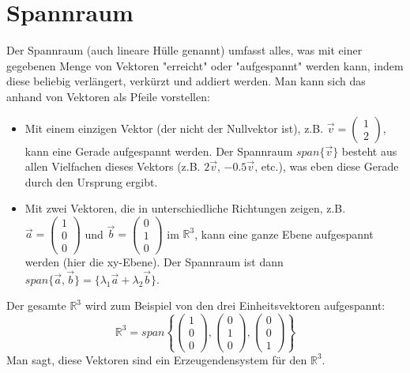 \section{Spannraum}
Der Spannraum (auch lineare Hülle genannt) umfasst alles, was mit einer gegebenen Menge von Vektoren "erreicht" oder "aufgespannt" werden kann, indem diese beliebig verlängert, verkürzt und addiert werden.
Man kann sich das anhand von Vektoren als Pfeile vorstellen:
\begin{itemize}
    \item Mit einem einzigen Vektor (der nicht der Nullvektor ist), z.B. \(\vec{v} = \begin{pmatrix} 1 \\ 2 \end{pmatrix}\), kann eine Gerade aufgespannt werden. Der Spannraum \(span\{\vec{v}\}\) besteht aus allen Vielfachen dieses Vektors (z.B. \(2\vec{v}\), \(-0.5\vec{v}\), etc.), was eben diese Gerade durch den Ursprung ergibt.
    \item Mit zwei Vektoren, die in unterschiedliche Richtungen zeigen, z.B. \(\vec{a} = \begin{pmatrix} 1 \\ 0 \\ 0 \end{pmatrix}\) und \(\vec{b} = \begin{pmatrix} 0 \\ 1 \\ 0 \end{pmatrix}\) im \(\mathbb{R}^3\), kann eine ganze Ebene aufgespannt werden (hier die xy-Ebene). Der Spannraum ist dann \(span\{\vec{a}, \vec{b}\} = \{ \lambda_1 \vec{a} + \lambda_2 \vec{b} \}\).
\end{itemize}
Der gesamte \(\mathbb{R}^3\) wird zum Beispiel von den drei Einheitsvektoren aufgespannt:
\[ \mathbb{R}^3 = span \left\{\begin{pmatrix} 1 \\ 0 \\ 0 \end{pmatrix}, \begin{pmatrix} 0 \\ 1 \\ 0 \end{pmatrix}, \begin{pmatrix} 0 \\ 0 \\ 1 \end{pmatrix}\right\} \]
Man sagt, diese Vektoren sind ein Erzeugendensystem für den \(\mathbb{R}^3\).

